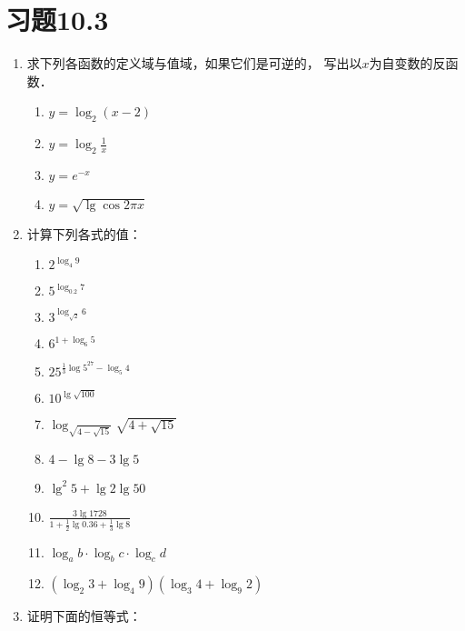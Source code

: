 \section*{习题10.3}
\begin{enumerate}
  \item 求下列各函数的定义域与值域，如果它们是可逆的，
  写出以$x$为自变数的反函数．
  \begin{multicols}{2}
    \begin{enumerate}
      \item $y=\log_2(x-2)$
      \item $y=\log_2\frac{1}{x}$
      \item $y=e^{-x}$
      \item $y=\sqrt{\lg\cos2\pi x}$
    \end{enumerate}
  \end{multicols}

  \item 计算下列各式的值：
\begin{multicols}{2}
\begin{enumerate}
  \item $2^{\log_4 9}$
  \item $5^{\log_{0.2} 7}$
  \item $3^{\log_{\sqrt{2}}6}$
  \item $6^{1+\log_6 5}$
  \item $25^{\tfrac{1}{3} \log 5^{27}-\log_{5} 4}$
  \item $10^{\lg\sqrt{100}}$
  \item $\log _{\sqrt{4-\sqrt{15}}} \sqrt{4+\sqrt{15}}$
  \item $4-\lg 8-3 \lg 5$
  \item $ \lg ^{2} 5+\lg 2 \lg 50$
  \item $\frac{3 \lg 1728}{1+\frac{1}{2} \lg 0.36+\frac{1}{3} \lg 8}$
  \item $\log _{a} b \cdot \log _{b} c \cdot \log _{c} d$
  \item $\left(\log _{2} 3+\log _{4} 9\right)\left(\log _{3} 4+\log _{9} 2\right)$
\end{enumerate}
\end{multicols}

\item 证明下面的恒等式：
\begin{enumerate}


\end{enumerate}
\end{enumerate}
